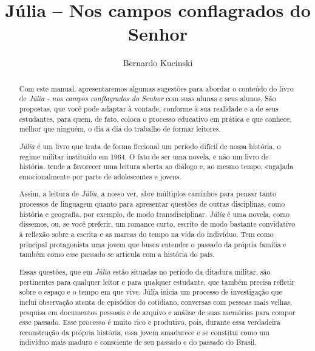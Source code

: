 \documentclass[12pt]{extarticle}
\begin{document}
\newcommand{\AutorLivro}{Bernardo Kucinski}
\newcommand{\TituloLivro}{Júlia – Nos campos conflagrados do Senhor}
\newcommand{\Tema}{Ficção, mistério e fantasia}
\newcommand{\Genero}{Romance}
\newcommand{\imagemCapa}{./images/PNLD0053-01.png}
\newcommand{\issnppub}{---}
\newcommand{\issnepub}{---}
\newcommand{\colaborador}{{Haroldo Ceravolo}}


\title{\TituloLivro}
\author{\AutorLivro}
\def\authornotes{\colaborador}

\date{}
\maketitle





\begin{abstract}

Com este manual, apresentaremos algumas sugestões para abordar o
conteúdo do livro de \emph{Júlia - nos campos conflagrados do Senhor}
com suas alunas e seus alunos. São propostas, que você pode adaptar à
vontade, conforme à sua realidade e a de seus estudantes, para quem, de
fato, coloca o processo educativo em prática e que conhece, melhor que
ninguém, o dia a dia do trabalho de formar leitores.

\emph{Júlia} é um livro que trata de forma ficcional um período difícil
de nossa história, o regime militar instituído em 1964. O fato de ser
uma novela, e não um livro de história, tende a favorecer uma leitura
aberta ao diálogo e, ao mesmo tempo, engajada emocionalmente por parte
de adolescentes e jovens.

Assim, a leitura de \emph{Júlia}, a nosso ver, abre múltiplos caminhos
para pensar tanto processos de linguagem quanto para apresentar questões
de outras disciplinas, como história e geografia, por exemplo, de modo
transdisciplinar. \emph{Júlia} é uma novela, como dissemos, ou, se você
preferir, um romance curto, escrito de modo bastante convidativo à
reflexão sobre a escrita e as marcas do tempo na vida do indivíduo. Tem
como principal protagonista uma jovem que busca entender o passado da
própria família e também como esse passado se articula com a história do
país.

Essas questões, que em \emph{Júlia} estão situadas no período da
ditadura militar, são pertinentes para qualquer leitor e para qualquer
estudante, que também precisa refletir sobre o espaço e o tempo em que
vive. Júlia inicia um processo de investigação que inclui observação
atenta de episódios do cotidiano, conversas com pessoas mais velhas,
pesquisa em documentos pessoais e de arquivo e análise de suas memórias
para compor esse passado. Esse processo é muito rico e produtivo, pois,
durante essa verdadeira reconstrução da própria história, essa jovem
amadurece e se constitui como um indivíduo mais maduro e consciente de
seu passado e do passado do Brasil.


\end{abstract}
\end{document}
